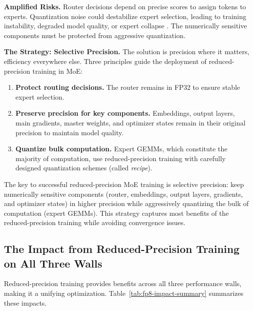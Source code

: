 \textbf{Amplified Risks.} Router decisions depend on precise scores to assign tokens to experts. Quantization noise could destabilize expert selection, leading to training instability, degraded model quality, or expert collapse \cite{nagel2021whitepaper}. The numerically sensitive components must be protected from aggressive quantization.

\textbf{The Strategy: Selective Precision.} The solution is precision where it matters, efficiency everywhere else. Three principles guide the deployment of reduced-precision training in MoE:
\begin{enumerate}
    \item \textbf{Protect routing decisions.} The router remains in FP32 to ensure stable expert selection.
    \item \textbf{Preserve precision for key components.} Embeddings, output layers, main gradients, master weights, and optimizer states remain in their original precision to maintain model quality.
    \item \textbf{Quantize bulk computation.} Expert GEMMs, which constitute the majority of computation, use reduced-precision training with carefully designed quantization schemes (called \textit{recipe}).
\end{enumerate}

\begin{notebox}
The key to successful reduced-precision MoE training is selective precision: keep numerically sensitive components (router, embeddings, output layers, gradients, and optimizer states) in higher precision while aggressively quantizing the bulk of computation (expert GEMMs). This strategy captures most benefits of the reduced-precision training while avoiding convergence issues.
\end{notebox}

\subsection{The Impact from Reduced-Precision Training on All Three Walls}

Reduced-precision training provides benefits across all three performance walls, making it a unifying optimization. Table~\ref{tab:fp8-impact-summary} summarizes these impacts.

